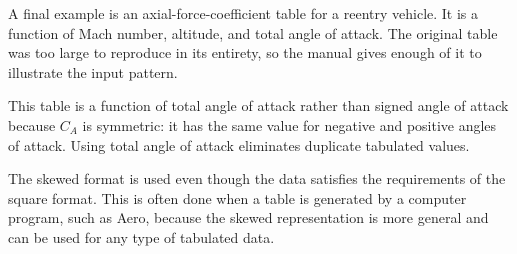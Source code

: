 A final example is an axial-force-coefficient table for a reentry vehicle. It is a
function of Mach number, altitude, and total angle of attack. The original table was
too large to reproduce in its entirety, so the manual gives enough of it to illustrate
the input pattern.



This table is a function of total angle of attack rather than signed angle of attack
because $C_A$ is symmetric: it has the same value for negative and positive angles
of attack. Using total angle of attack eliminates duplicate tabulated values.

The skewed format is used even though the data satisfies the requirements of the
square format. This is often done when a table is generated by a computer program,
such as Aero, because the skewed representation is more general and can
be used for any type of tabulated data.
